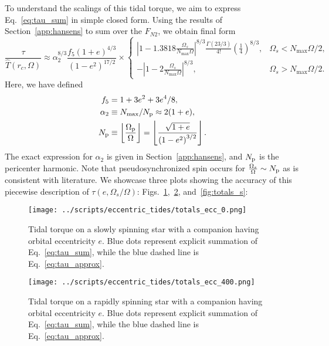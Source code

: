 \documentclass[
        fleqn,
        usenatbib,
        referee,
    ]{mnras}
\newcommand*{\abs}[1]{\left|#1\right|}
\newcommand*{\p}[1]{\left(#1\right)}
\begin{document}
To understand the scalings of this tidal torque, we aim to express
Eq.~\eqref{eq:tau_sum} in simple closed form. Using the results of
Section~\ref{app:hansens} to sum over the $F_{N2}$, we obtain final form
\begin{equation}
    \frac{\tau}{\hat{T}\p{r_c, \Omega}} \approx \alpha_{2}^{8/3}
        \frac{f_5\p{1 + e}^{4/3}}{\p{1 - e^2}^{17/2}} \times
    \begin{cases}
        \abs{1 - 1.3818\frac{\Omega_s}{N_{\max}\Omega}}^{8/3}
            \frac{\Gamma(23/3)}{4!}\p{\frac{1}{4}}^{8/3},
            & \Omega_s < N_{\max}\Omega / 2,\\[5pt]
        -\abs{1 - 2\frac{\Omega_s}{N_{\max}\Omega}}^{8/3},
            & \Omega_s > N_{\max}\Omega / 2.
    \end{cases}\label{eq:tau_approx}
\end{equation}
Here, we have defined
\begin{align}
    f_5 &= 1 + 3e^2 + 3e^4/8,\label{eq:f5}\\
    \alpha_{2} &\equiv N_{\max} / N_{\rm p} \approx 2(1 + e),\\
    N_{\rm p} &\equiv \left\lfloor \frac{\Omega_{\rm p}}{\Omega} \right\rfloor
        = \left\lfloor \frac{\sqrt{1 + e}}{\p{1 - e^2}^{3/2}} \right\rfloor.
\end{align}
The exact expression for $\alpha_{2}$ is given in Section~\ref{app:hansens},
and $N_{\rm p}$ is the pericenter harmonic. Note that pseudosynchronized spin
occurs for $\frac{\Omega_s}{\Omega} \sim N_{\rm p}$ as is consistent with
literature. We showcase three plots showing the accuracy of this piecewise
description of $\tau\p{e, \Omega_s / \Omega}$:
Figs.~\ref{fig:totals_ecc0},~\ref{fig:totals_ecc400},
and~\ref{fig:totals_s}:
\begin{figure}
    \centering
    \texttt{[image: ../scripts/eccentric\_tides/totals\_ecc\_0.png]}
    \caption{Tidal torque on a slowly spinning star with a companion having
    orbital eccentricity $e$. Blue dots represent explicit summation of
    Eq.~\eqref{eq:tau_sum}, while the blue dashed line is
    Eq.~\eqref{eq:tau_approx}.}\label{fig:totals_ecc0}
\end{figure}
\begin{figure}
    \centering
    \texttt{[image: ../scripts/eccentric\_tides/totals\_ecc\_400.png]}
    \caption{Tidal torque on a rapidly spinning star with a companion having
    orbital eccentricity $e$. Blue dots represent explicit summation of
    Eq.~\eqref{eq:tau_sum}, while the blue dashed line is
    Eq.~\eqref{eq:tau_approx}.}\label{fig:totals_ecc400}
\end{figure}
\end{document}
